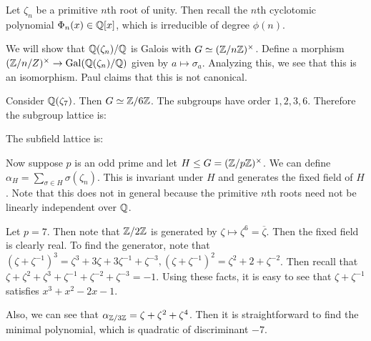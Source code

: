 \message{ !name(notes.tex)}\documentclass[10pt, twoside]{article}
\begin{document}
        Let $\zeta_n$ be a primitive $n$th root of unity. Then recall the $n$th cyclotomic polynomial $\Phi_n(x) \in \mathbb{Q}[x]$, which is irreducible of degree $\phi(n)$.

        We will show that $\mathbb{Q}(\zeta_n)/\mathbb{Q}$ is Galois with $G \simeq (\mathbb{Z}/n\mathbb{Z})^{\times}$. Define a morphism $(\mathbb{Z}/n/Z)^{\times} \to \mathrm{Gal}(\mathbb{Q}(\zeta_n)/\mathbb{Q})$ given by $a \mapsto \sigma_a$. Analyzing this, we see that this is an isomorphism. Paul claims that this is not canonical.

        \begin{exm}
            Consider $\mathbb{Q}(\zeta_7)$. Then $G \simeq \mathbb{Z}/6\mathbb{Z}$. The subgroups have order $1,2,3,6$.
            Therefore the subgroup lattice is:
            \begin{center}
            \end{center}
            
            The subfield lattice is:
            \begin{center}
            \end{center}
        \end{exm}
        
        Now suppose $p$ is an odd prime and let $H \leq G = (\mathbb{Z}/p\mathbb{Z})^{\times}$. We can define $\alpha_H = \sum_{\sigma \in H} \sigma(\zeta_n)$. This is invariant under $H$ and generates the fixed field of $H$. Note that this does not in general because the primitive $n$th roots need not be linearly independent over $\mathbb{Q}$.

        \begin{exm}
            Let $p = 7$. Then note that $\mathbb{Z}/2\mathbb{Z}$ is generated by $\zeta \mapsto \zeta^6 = \overline{\zeta}$. Then the fixed field is clearly real. To find the generator, note that $(\zeta+\zeta^{-1})^3 = \zeta^3 + 3\zeta + 3 \zeta^{-1} + \zeta^{-3}, (\zeta+\zeta^{-1})^2 = \zeta^2+2+\zeta^{-2}$. Then recall that $\zeta + \zeta^2 + \zeta^3 + \zeta^{-1} + \zeta^{-2} + \zeta^{-3} = -1$. Using these facts, it is easy to see that $\zeta+\zeta^{-1}$ satisfies $x^3+x^2-2x-1$.

            Also, we can see that $\alpha_{\mathbb{Z}/3\mathbb{Z}} = \zeta + \zeta^2 + \zeta^4$. Then it is straightforward to find the minimal polynomial, which is quadratic of discriminant $-7$.
        \end{exm}
\end{document}
